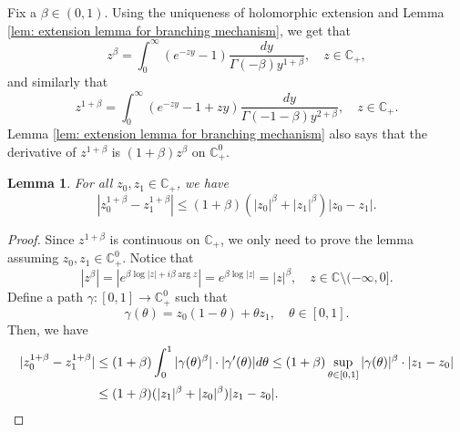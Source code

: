 \documentclass[12pt,a4paper]{amsart}
\theoremstyle{plain}
\newtheorem{lem}[thm]{Lemma}
\theoremstyle{definition}
\numberwithin{equation}{section}
\begin{document}
Fix a $\beta \in (0,1)$.
Using the uniqueness of holomorphic extension and Lemma \ref{lem: extension lemma for branching mechanism}, we get that
\begin{equation}
  z^{\beta}
	= \int_0^\infty (e^{-zy}-1) \frac{dy}{\Gamma(-\beta)y^{1+\beta}},
  \quad z\in \mathbb C_+,
\end{equation}
and similarly that
\begin{equation}
  \label{eq: stable branching on C+}
  z^{1+\beta}
  = \int_0^\infty (e^{-zy}-1+zy)\frac{dy}{\Gamma(-1-\beta)y^{2+\beta}},
  \quad z\in \mathbb C_+.
\end{equation}
Lemma \ref{lem: extension lemma for branching mechanism} also says that the derivative of $z^{1+\beta}$ is $(1+\beta)z^{\beta}$ on $\mathbb C^0_+$.
\begin{lem}
  \label{lem: Lip of power function}
  For all $z_0,z_1 \in \mathbb C_+$, we have
\begin{equation}
  \label{eq: Lip of power function}
  |z_0^{1+\beta} - z_1^{1+\beta}|
  \leq (1+\beta)(|z_0|^{\beta}+|z_1|^{\beta})|z_0 - z_1|.
\end{equation}
\end{lem}
\begin{proof}
  Since $z^{1+\beta}$ is continuous on $\mathbb C_+$, we only need to prove the lemma assuming $z_0,z_1 \in \mathbb C^0_+$.
  Notice that
\begin{equation}
  \label{eq: upper bound for beta power of z}
	|z^\beta|
	= |e^{\beta \log |z| +i\beta \operatorname {arg}z}| = e^{\beta \log |z|} = |z|^\beta,
	\quad z \in \mathbb C\setminus (-\infty, 0].
\end{equation}
Define a path $\gamma: [0,1] \to \mathbb C^0_+$ such that
\[
  \gamma(\theta)
  = z_0 (1-\theta) + \theta z_1,
  \quad \theta \in [0,1].
\]
Then, we have
\begin{align}
  |z_0^{1+\beta} - z_1^{1+\beta}|
  & \leq (1+\beta) \int_0^1 |\gamma(\theta)^{\beta}|\cdot |\gamma'(\theta)|d\theta
    \leq (1+\beta)  \sup_{\theta \in [0,1]} |\gamma(\theta)|^{\beta} \cdot |z_1-z_0| \\
  & \leq (1+\beta)  ( |z_1|^{\beta}+|z_0|^{\beta} ) |z_1-z_0|.
    \qedhere
\end{align}
\end{proof}
\end{document}
